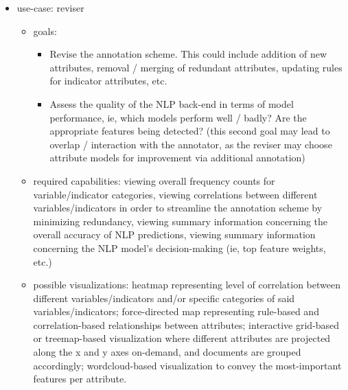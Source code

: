 \documentclass[11pt,letterpaper]{article}
\begin{document}
\begin{itemize}
\item use-case: reviser
\begin{itemize}
\item goals: 
\begin{itemize}
\item Revise the annotation scheme. This could include addition of new attributes, removal / merging of redundant attributes, updating rules for indicator attributes, etc.
\item Assess the quality of the NLP back-end in terms of model performance, ie, which models perform well / badly? Are the appropriate features being detected? (this second goal may lead to overlap / interaction with the annotator, as the reviser may choose attribute models for improvement via additional annotation)
\end{itemize}
\item required capabilities: viewing overall frequency counts for variable/indicator categories, viewing correlations between different variables/indicators in order to streamline the annotation scheme by minimizing redundancy, viewing summary information concerning the overall accuracy of NLP predictions, viewing summary information concerning the NLP model's decision-making (ie, top feature weights, etc.)
\item possible visualizations: heatmap representing level of correlation between different variables/indicators and/or specific categories of said variables/indicators; force-directed map representing rule-based and correlation-based relationships between attributes; interactive grid-based or treemap-based visualization where different attributes are projected along the x and y axes on-demand, and documents are grouped accordingly; wordcloud-based visualization to convey the most-important features per attribute.
\end{itemize}


\end{itemize}
\end{document}
